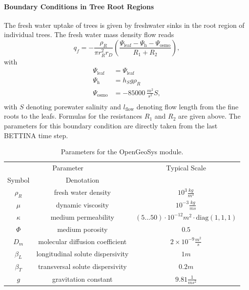 \documentclass[manusscript, 12p, authoryear]{elsarticle}
\begin{document}
\paragraph{\textbf{Boundary Conditions in Tree Root Regions}}
The fresh water uptake of trees is given by freshwater sinks in the root region of individual trees.
The fresh water mass density flow reads
\begin{equation}
q_f = - \frac{\rho_R}{\pi r_R^2 r_D}\left(\frac{\Psi_{\text{leaf}} - \Psi_{\text{h}}-\Psi_{\text{osmo}}}{R_1+R_2}\right),
\end{equation}
with
\begin{align}
\Psi_{\text{leaf}}&=\Psi_{\text{leaf}}\\
\Psi_{\text{h}}&=h_S g \rho_R \\
\Psi_{\text{osmo}}& = -\SI{85000}{\frac{m^2}{ s^2}} S,
\\
\end{align}
with $S$ denoting porewater salinity and $l_{\text{flow}}$ denoting flow length from the fine roots to the leafs.
Formulas for the resistances $R_1$ and $R_2$ are given above.
The parameters for this boundary condition are directly taken from the last BETTINA time step.
\begin{table}[h] \label{tab_ogs_parameter}\centering
\begin{tabular}{|c|c|c|}
\hline 
\multicolumn{2}{|c|}{Parameter} & Typical Scale  \\ 
Symbol & Denotation & \\ 
\hline 
$\rho_R$ & fresh water density & $10^3 \frac{kg}{m^3}$ \\ 
\hline 
$\mu$ & dynamic viscosity & $10^{-3} \frac{kg}{ms}$ \\ 
\hline 
$\kappa$ & medium permeability & $(5...50)\cdot 10^{-12} m^2 \cdot{\text{diag}\left(1,1,1\right)}$ \\ 
\hline 
$\Phi$ & medium porosity & $0.5$ \\ 
\hline 
$D_m$ & molecular diffusion coefficient & $2\times 10^{-9} \frac{m^2}{s}$ \\ 
\hline 
$\beta_L$ & longitudinal solute dispersivity & $1m$ \\ 
\hline 
$\beta_T$ & transversal solute dispersivity & $0.2m$ \\  
\hline 
$g$ & gravitation constant & $9.81 \frac{1}{ms^2}$ \\  
\hline 
\end{tabular} 
\caption{Parameters for the OpenGeoSys module.}
\end{table}


\end{document}
